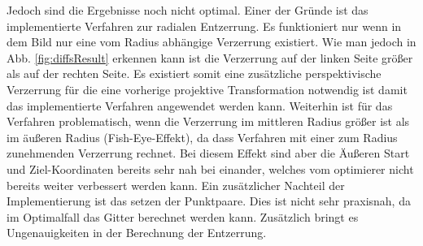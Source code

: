 Jedoch sind die Ergebnisse noch nicht optimal. Einer der Gründe ist
das implementierte Verfahren zur radialen Entzerrung. Es funktioniert nur wenn in dem Bild nur eine vom Radius abhängige Verzerrung existiert. Wie man jedoch in Abb. \ref{fig:diffsResult} erkennen kann ist die Verzerrung auf der linken Seite größer als auf der rechten Seite.
Es existiert somit eine zusätzliche perspektivische Verzerrung für die eine vorherige projektive Transformation notwendig ist damit das implementierte Verfahren angewendet werden kann.
Weiterhin ist für das Verfahren problematisch, wenn die Verzerrung im mittleren Radius größer ist als im äußeren Radius (Fish-Eye-Effekt), da dass Verfahren mit einer zum Radius zunehmenden Verzerrung rechnet. Bei diesem Effekt sind aber die Äußeren Start und Ziel-Koordinaten bereits sehr nah bei einander, welches vom optimierer nicht bereits weiter verbessert werden kann.
Ein zusätzlicher Nachteil der Implementierung ist das setzen der Punktpaare. Dies ist nicht sehr praxisnah, da im Optimalfall das Gitter berechnet werden kann. Zusätzlich bringt es Ungenauigkeiten in der Berechnung der Entzerrung.
